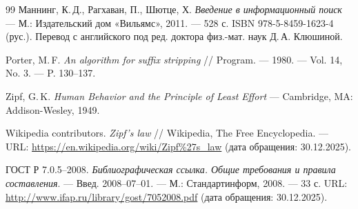 \begin{thebibliography}{99}
Маннинг, К.\,Д., Рагхаван, П., Шютце, Х.
{\itshape Введение в информационный поиск} — М.: Издательский дом «Вильямс», 2011. — 528 с.
ISBN 978-5-8459-1623-4 (рус.). Перевод с английского под ред. доктора физ.-мат. наук Д.\,А. Клюшиной.

Porter, M.\,F.
{\itshape An algorithm for suffix stripping} // Program. — 1980. — Vol. 14, No. 3. — P. 130–137.

Zipf, G.\,K.
{\itshape Human Behavior and the Principle of Least Effort} — Cambridge, MA: Addison-Wesley, 1949.

Wikipedia contributors.
{\itshape Zipf's law} // Wikipedia, The Free Encyclopedia. — URL: \url{https://en.wikipedia.org/wiki/Zipf%27s_law} (дата обращения: 30.12.2025).

ГОСТ Р 7.0.5–2008.
{\itshape Библиографическая ссылка. Общие требования и правила составления}. — Введ. 2008–07–01. — М.: Стандартинформ, 2008. — 33 с.
URL: \url{http://www.ifap.ru/library/gost/7052008.pdf} (дата обращения: 30.12.2025).

\end{thebibliography}
\pagebreak
